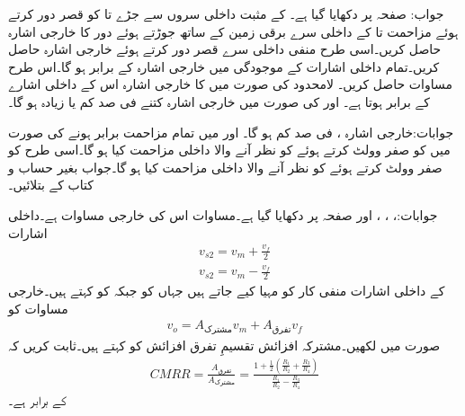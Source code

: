 جواب: 
صفحہ  پر   دکھایا گیا ہے۔  کے مثبت داخلی سروں  سے جڑے  تا  کو قصر دور کرتے ہوئے مزاحمت  تا  کے داخلی سرے برقی زمین کے ساتھ جوڑتے ہوئے  دور کا خارجی اشارہ  حاصل کریں۔اسی طرح منفی داخلی سرے  قصر دور کرتے ہوئے خارجی اشارہ  حاصل کریں۔تمام داخلی اشارات  کے موجودگی میں خارجی اشارہ  کے برابر ہو گا۔اس طرح  مساوات   حاصل کریں۔
لامحدود  کی صورت میں  کا خارجی اشارہ اس کے داخلی اشارے کے برابر ہوتا ہے۔ اور
 کی صورت میں خارجی اشارہ کتنے فی صد کم  یا زیادہ ہو گا۔

جوابات:خارجی اشارہ  ،  فی صد کم ہو گا۔
 اور  میں تمام مزاحمت برابر ہونے کی صورت میں   کو صفر وولٹ کرتے ہوئے  کو نظر آنے والا داخلی مزاحمت کیا ہو گا۔اسی طرح   کو صفر وولٹ کرتے ہوئے  کو نظر آنے والا داخلی مزاحمت کیا ہو گا۔جواب بغیر حساب و کتاب کے بتلائیں۔

جوابات:، ، ، اور 
صفحہ  پر  دکھایا گیا ہے۔مساوات  اس کی خارجی مساوات ہے۔داخلی اشارات
\begin{align*}
v_{s2}=v_m+\frac{v_f}{2}\\
v_{s2}=v_m-\frac{v_f}{2}
\end{align*}
کے داخلی اشارات منفی کار کو مہیا کیے جاتے ہیں جہاں  کو  جبکہ  کو  کہتے ہیں۔خارجی مساوات کو
\begin{align}
v_o=A_{\text{مشترک}} v_m +A_{\text{تفرق}} v_f
\end{align}
صورت میں لکھیں۔مشترکہ افزائش تقسیمِ تفرق افزائش کو   کہتے ہیں۔ثابت کریں کہ
\begin{align*}
CMRR=\frac{A_{\text{تفرق}}}{A_{\text{مشترک}}}=\frac{1+\frac{1}{2}\left(\frac{R_1}{R_2}+\frac{R_3}{R_4} \right)}{\frac{R_1}{R_2}-\frac{R_3}{R_4}}
\end{align*}
کے برابر ہے۔

